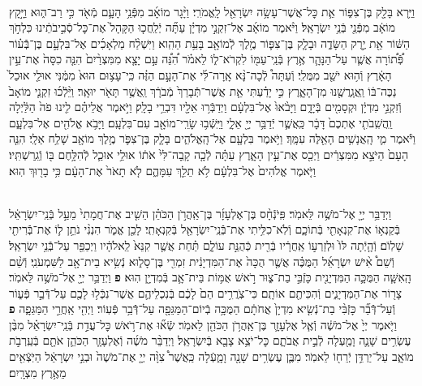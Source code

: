 \documentclass[twoside, openany, parskip=half, 11pt]{book}
\begin{document}
\begin{sometimes}
\begin{footnotesize}
\begin{multicols}{2}
\\
וַיַּ֥רְא בָּלָ֖ק בֶּן־צִפּ֑וֹר אֵ֛ת כׇּל־אֲשֶׁר־עָשָׂ֥ה יִשְׂרָאֵ֖ל לָֽאֱמֹרִֽי׃ וַיָּ֨גָר מוֹאָ֜ב מִפְּֿנֵ֥י הָעָ֛ם מְֿאֹ֖ד כִּ֣י רַב־ה֑וּא וַיָּ֣קָץ מוֹאָ֔ב מִפְּֿנֵ֖י בְּֿנֵ֥י יִשְׂרָאֵֽל׃ וַיֹּ֨אמֶר מוֹאָ֜ב אֶל־זִקְנֵ֣י מִדְיָ֗ן עַתָּ֞ה יְֿלַֽחֲכ֤וּ הַקָּהָל֙ אֶת־כׇּל־סְֿבִ֣יבֹתֵ֔ינוּ כִּלְחֹ֣ךְ הַשּׁ֔וֹר אֵ֖ת יֶ֣רֶק הַשָּׂדֶ֑ה וּבָלָ֧ק בֶּן־צִפּ֛וֹר מֶ֥לֶךְ לְֿמוֹאָ֖ב בָּעֵ֥ת הַהִֽוא׃  וַיִּשְׁלַ֨ח מַלְאָכִ֜ים אֶל־בִּלְעָ֣ם בֶּן־בְּֿֿע֗וֹר פְּֿ֠ת֠וֹרָה אֲשֶׁ֧ר עַל־הַנָּהָ֛ר אֶ֥רֶץ בְּֿנֵֽי־עַמּ֖וֹ לִקְרֹא־ל֑וֹ לֵאמֹ֗ר הִ֠נֵּ֠ה עַ֣ם יָצָ֤א מִמִּצְרַ֨יִם֙ הִנֵּ֤ה כִסָּה֙ אֶת־עֵ֣ין הָאָ֔רֶץ וְֿה֥וּא יֹשֵׁ֖ב מִמֻּלִֽי׃ וְֿעַתָּה֩ לְֿכָה־נָּ֨א אָֽרָה־לִּ֜י אֶת־הָעָ֣ם הַזֶּ֗ה כִּֽי־עָצ֥וּם הוּא֙ מִמֶּ֔נִּי אוּלַ֤י אוּכַל֙ נַכֶּה־בּ֔וֹ וַֽאֲגָֽרֲשֶׁ֖נּוּ מִן־הָאָ֑רֶץ כִּ֣י יָדַ֗עְתִּי אֵ֤ת אֲשֶׁר־תְּֿֿבָרֵךְ֙ מְֿבֹרָ֔ךְ וַֽאֲשֶׁ֥ר תָּאֹ֖ר יוּאָֽר׃ וַיֵּ֨לְֿכ֜וּ זִקְנֵ֤י מוֹאָב֙ וְֿזִקְנֵ֣י מִדְיָ֔ן וּקְסָמִ֖ים בְּֿיָדָ֑ם וַיָּבֹ֨אוּ֙ אֶל־בִּלְעָ֔ם וַיְדַבְּֿר֥וּ אֵלָ֖יו דִּבְרֵ֥י בָלָֽק׃  וַיֹּ֣אמֶר אֲלֵיהֶ֗ם לִ֤ינוּ פֹה֙ הַלַּ֔יְלָה וַֽהֲשִֽׁבֹתִ֤י אֶתְכֶם֙ דָּבָ֔ר כַּֽאֲשֶׁ֛ר יְֿדַבֵּ֥ר יְיָ֖ אֵלָ֑י וַיֵּֽשְֿׁב֥וּ שָׂרֵֽי־מוֹאָ֖ב עִם־בִּלְעָֽם׃ וַיָּבֹ֥א אֱלֹהִ֖ים אֶל־בִּלְעָ֑ם וַיֹּ֕אמֶר מִ֛י הָֽאֲנָשִׁ֥ים הָאֵ֖לֶּה עִמָּֽךְ׃ וַיֹּ֥אמֶר בִּלְעָ֖ם אֶל־הָֽאֱלֹהִ֑ים בָּלָ֧ק בֶּן־צִפֹּ֛ר מֶ֥לֶךְ מוֹאָ֖ב שָׁלַ֥ח אֵלָֽי׃ הִנֵּ֤ה הָעָם֙ הַיֹּצֵ֣א מִמִּצְרַ֔יִם וַיְכַ֖ס אֶת־עֵ֣ין הָאָ֑רֶץ עַתָּ֗ה לְֿכָ֤ה קָֽבָה־לִּי֙ אֹת֔וֹ אוּלַ֥י אוּכַ֛ל לְֿהִלָּ֥חֶם בּ֖וֹ וְֿגֵֽרַשְׁתִּֽיו׃ וַיֹּ֤אמֶר אֱלֹהִים֙ אֶל־בִּלְעָ֔ם לֹ֥א תֵלֵ֖ךְ עִמָּהֶ֑ם לֹ֤א תָאֹר֙ אֶת־הָעָ֔ם כִּ֥י בָר֖וּךְ הֽוּא׃

\\
וַיְדַבֵּ֥ר יְיָ֖ אֶל־מֹשֶׁ֥ה לֵּאמֹֽר׃ פִּֽיֹנְֿחָ֨ס בֶּן־אֶלְעָזָ֜ר בֶּן־אַֽהֲרֹ֣ן הַכֹּהֵ֗ן הֵשִׁ֤יב אֶת־חֲמָתִי֙ מֵעַ֣ל בְּֿנֵֽי־יִשְׂרָאֵ֔ל בְּֿקַנְא֥וֹ אֶת־קִנְאָתִ֖י בְּֿתוֹכָ֑ם וְֿלֹֽא־כִלִּ֥יתִי אֶת־בְּֿֿנֵֽי־יִשְׂרָאֵ֖ל בְּֿקִנְאָתִֽי׃ לָכֵ֖ן אֱמֹ֑ר הִנְנִ֨י נֹתֵ֥ן ל֛וֹ אֶת־בְּֿֿרִיתִ֖י שָׁלֽוֹֹם׃  וְֿהָ֤יְֿתָה לּוֹ֙ וּלְזַרְע֣וֹ אַֽחֲרָ֔יו בְּֿרִ֖ית כְּֿהֻנַּ֣ת עוֹלָ֑ם תַּ֗חַת אֲשֶׁ֤ר קִנֵּא֙ לֵֽאלֹהָ֔יו וַיְכַפֵּ֖ר עַל־בְּֿֿנֵ֥י יִשְׂרָאֵֽל׃ וְֿשֵׁם֩ אִ֨ישׁ יִשְׂרָאֵ֜ל הַמֻּכֶּ֗ה אֲשֶׁ֤ר הֻכָּה֙ אֶת־הַמִּדְיָנִ֔ית זִמְרִ֖י בֶּן־סָל֑וּא נְֿשִׂ֥יא בֵית־אָ֖ב לַשִּׁמְעֹנִֽי׃ וְֿשֵׁ֨ם הָֽאִשָּׁ֧ה הַמֻּכָּ֛ה הַמִּדְיָנִ֖ית כָּזְֿבִּ֣י בַת־צ֑וּר רֹ֣אשׁ אֻמּ֥וֹת בֵּית־אָ֛ב בְּֿמִדְיָ֖ן הֽוּא׃ \textbf{פ}
וַיְדַבֵּ֥ר יְיָ֖ אֶל־מֹשֶׁ֥ה לֵּאמֹֽר׃ צָר֖וֹר אֶת־הַמִּדְיָנִ֑ים וְֿהִכִּיתֶ֖ם אוֹתָֽם׃ כִּי־צֹֽרֲרִ֥ים הֵם֙ לָכֶ֔ם בְּֿנִכְלֵיהֶ֛ם אֲשֶׁר־נִכְּֿל֥וּ לָכֶ֖ם עַל־דְּֿֿבַ֣ר פְּֿע֑וֹר וְֿעַל־דְּֿֿבַ֞ר כָּזְֿבִּ֨י בַת־נְֿשִׂ֤יא מִדְיָן֙ אֲחֹתָ֔ם הַמֻּכָּ֥ה בְֿיוֹם־הַמַּגֵּפָ֖ה עַל־דְּֿֿבַ֥ר פְּֿעֽוֹר׃ וַיְהִ֖י אַֽחֲרֵ֣י הַמַּגֵּפָ֑ה \textbf{פ}
וַיֹּ֤אמֶר יְיָ֙ אֶל־מֹשֶׁ֔ה וְֿאֶ֧ל אֶלְעָזָ֛ר בֶּן־אַֽהֲרֹ֥ן הַכֹּהֵ֖ן לֵאמֹֽר׃ שְֿׂא֞וּ אֶת־רֹ֣אשׁ כׇּל־עֲדַ֣ת בְּֿנֵֽי־יִשְׂרָאֵ֗ל מִבֶּ֨ן עֶשְׂרִ֥ים שָׁנָ֛ה וָמַ֖עְלָה לְֿבֵ֣ית אֲבֹתָ֑ם כׇּל־יֹצֵ֥א צָבָ֖א בְּֿיִשְׂרָאֵֽל׃ וַיְדַבֵּ֨ר מֹשֶׁ֜ה וְֿאֶלְעָזָ֧ר הַכֹּהֵ֛ן אֹתָ֖ם בְּֿעַֽרְבֹ֣ת מוֹאָ֑ב עַל־יַרְדֵּ֥ן יְֿרֵח֖וֹ לֵאמֹֽר׃ מִבֶּ֛ן עֶשְׂרִ֥ים שָׁנָ֖ה וָמָ֑עְֿלָה כַּֽאֲשֶׁר֩ צִוָּ֨ה יְיָ֤ אֶת־מֹשֶׁה֙ וּבְנֵ֣י יִשְׂרָאֵ֔ל הַיֹּֽצְֿאִ֖ים מֵאֶ֥רֶץ מִצְרָֽיִם׃



\end{multicols}
\end{footnotesize}
\end{sometimes}
\end{document}
